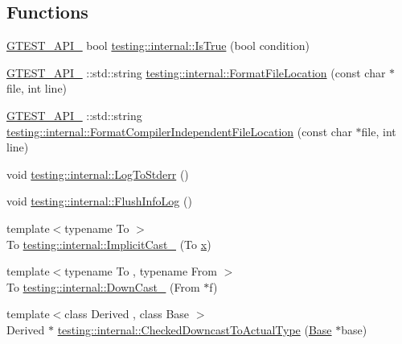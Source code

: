 \subsection*{Functions}
\begin{DoxyCompactItemize}
\item 
\mbox{\hyperlink{_obj__test_2lib_2googletest-release-1_88_81_2googletest_2include_2gtest_2internal_2gtest-port_8h_aa73be6f0ba4a7456180a94904ce17790}{G\+T\+E\+S\+T\+\_\+\+A\+P\+I\+\_\+}} bool \mbox{\hyperlink{namespacetesting_1_1internal_a527b9bcc13669b9a16400c8514266254}{testing\+::internal\+::\+Is\+True}} (bool condition)
\item 
\mbox{\hyperlink{_obj__test_2lib_2googletest-release-1_88_81_2googletest_2include_2gtest_2internal_2gtest-port_8h_aa73be6f0ba4a7456180a94904ce17790}{G\+T\+E\+S\+T\+\_\+\+A\+P\+I\+\_\+}} \+::std\+::string \mbox{\hyperlink{namespacetesting_1_1internal_a31b7c3abed4a7c395f42c61e993989f4}{testing\+::internal\+::\+Format\+File\+Location}} (const char $\ast$file, int line)
\item 
\mbox{\hyperlink{_obj__test_2lib_2googletest-release-1_88_81_2googletest_2include_2gtest_2internal_2gtest-port_8h_aa73be6f0ba4a7456180a94904ce17790}{G\+T\+E\+S\+T\+\_\+\+A\+P\+I\+\_\+}} \+::std\+::string \mbox{\hyperlink{namespacetesting_1_1internal_a1ee4cde97868c53e442d3182496a9f3c}{testing\+::internal\+::\+Format\+Compiler\+Independent\+File\+Location}} (const char $\ast$file, int line)
\item 
void \mbox{\hyperlink{namespacetesting_1_1internal_a06b1b20029fbd1dbeb59752f914fab84}{testing\+::internal\+::\+Log\+To\+Stderr}} ()
\item 
void \mbox{\hyperlink{namespacetesting_1_1internal_a2135f223bf6b527729aeaa651115183b}{testing\+::internal\+::\+Flush\+Info\+Log}} ()
\item 
{\footnotesize template$<$typename To $>$ }\\To \mbox{\hyperlink{namespacetesting_1_1internal_a982df3f369643b175f79cda4048bc3b9}{testing\+::internal\+::\+Implicit\+Cast\+\_\+}} (To \mbox{\hyperlink{_obj__test_2lib_2googletest-master_2googlemock_2test_2gmock-matchers__test_8cc_a6150e0515f7202e2fb518f7206ed97dc}{x}})
\item 
{\footnotesize template$<$typename To , typename From $>$ }\\To \mbox{\hyperlink{namespacetesting_1_1internal_a1a1a1aed3fe00908b8a45d5ab4a33665}{testing\+::internal\+::\+Down\+Cast\+\_\+}} (From $\ast$f)
\item 
{\footnotesize template$<$class Derived , class Base $>$ }\\Derived $\ast$ \mbox{\hyperlink{namespacetesting_1_1internal_af54f5cf4d9e03836ecc0316d090cb4ed}{testing\+::internal\+::\+Checked\+Downcast\+To\+Actual\+Type}} (\mbox{\hyperlink{class_base}{Base}} $\ast$base)

\end{DoxyCompactItemize}
